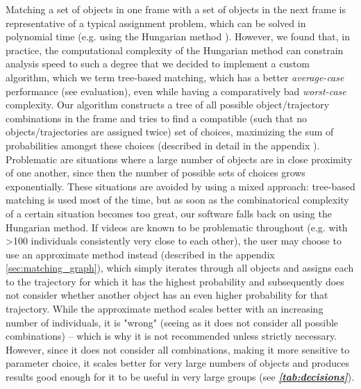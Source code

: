 \documentclass[9pt,lineno]{elife}
\newcommand{\tableref}[1]{\textit{\textbf{\ref{tab:#1}}}\xspace}
\begin{document}
Matching a set of objects in one frame with a set of objects in the next frame is representative of a typical assignment problem, which can be solved in polynomial time (e.g. using the Hungarian method \citealt{kuhn1955hungarian}). However, we found that, in practice, the computational complexity of the Hungarian method can constrain analysis speed to such a degree that we decided to implement a custom algorithm, which we term tree-based matching, which has a better \textit{average-case} performance (see evaluation), even while having a comparatively bad \textit{worst-case} complexity. Our algorithm constructs a tree of all possible object/trajectory combinations in the frame and tries to find a compatible (such that no objects/trajectories are assigned twice) set of choices, maximizing the sum of probabilities amongst these choices (described in detail in the appendix ). Problematic are situations where a large number of objects are in close proximity of one another, since then the number of possible sets of choices grows exponentially. These situations are avoided by using a mixed approach: tree-based matching is used most of the time, but as soon as the combinatorical complexity of a certain situation becomes too great, our software falls back on using the Hungarian method. If videos are known to be problematic throughout (e.g. with >100 individuals consistently very close to each other), the user may choose to use an approximate method instead (described in the appendix \autoref{sec:matching_graph}), which simply iterates through all objects and assigns each to the trajectory for which it has the highest probability and subsequently does not consider whether another object has an even higher probability for that trajectory. While the approximate method scales better with an increasing number of individuals, it is "wrong" (seeing as it does not consider all possible combinations) -- which is why it is not recommended unless strictly necessary. However, since it does not consider all combinations, making it more sensitive to parameter choice, it scales better for very large numbers of objects and produces results good enough for it to be useful in very large groups (see \tableref{decisions}). %
\end{document}
